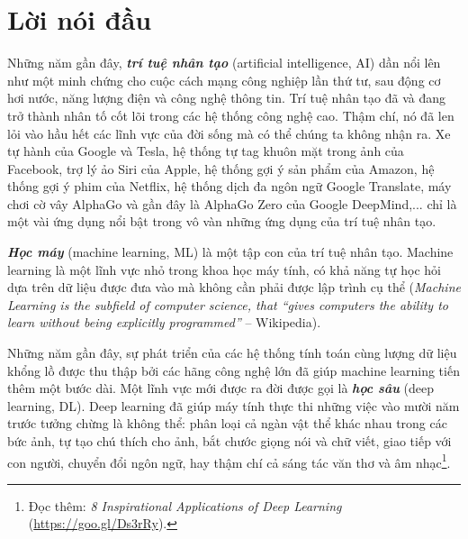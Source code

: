 
\setcounter{chapter}{-1}
\chapter{Lời nói đầu}
\label{cha:introduce}

Những năm gần đây, \textbf{\textit{trí tuệ nhân tạo}} ({artificial
intelligence, AI}) dần nổi lên như một minh chứng cho cuộc cách mạng công
nghiệp lần thứ tư, sau động cơ hơi nước, năng lượng điện và công nghệ thông
tin. Trí tuệ nhân tạo đã và đang trở thành nhân tố cốt lõi trong các hệ thống
công nghệ cao. Thậm chí, nó đã len lỏi vào hầu hết các lĩnh vực của đời sống mà
có thể chúng ta không nhận ra. Xe tự hành của Google và Tesla, hệ thống tự tag
khuôn mặt trong ảnh của Facebook, trợ lý ảo Siri của Apple, hệ thống gợi ý sản
phẩm của Amazon, hệ thống gợi ý phim của Netflix, hệ thống dịch đa ngôn ngữ
Google Translate, máy chơi cờ vây AlphaGo và gần đây là AlphaGo Zero của Google
DeepMind,... chỉ là một vài ứng dụng nổi bật trong vô vàn những ứng dụng của
trí tuệ nhân tạo.

\textbf{\textit{Học máy}} ({machine learning, ML}) là một tập con của
trí tuệ nhân tạo. Machine learning là một lĩnh vực nhỏ trong khoa học máy tính,
có khả năng tự học hỏi dựa trên dữ liệu được đưa vào mà không cần phải được lập
trình cụ thể (\textit{Machine Learning is the subfield of computer science, that
``gives computers the ability to learn without being explicitly programmed''} --
Wikipedia).

Những năm gần đây, sự phát triển của các hệ thống tính toán cùng lượng dữ liệu
khổng lồ được thu thập bởi các hãng công nghệ lớn đã giúp machine learning tiến
thêm một bước dài. Một lĩnh vực mới được ra đời được gọi là \textbf{\textit{học
sâu}} ({deep learning, DL}). Deep learning đã giúp máy tính thực thi
những việc vào mười năm trước tưởng chừng là không thể: phân loại cả ngàn vật
thể khác nhau trong các bức ảnh, tự tạo chú thích cho ảnh, bắt chước giọng nói
và chữ viết, giao tiếp với con người, chuyển đổi ngôn ngữ, hay thậm chí cả sáng
tác văn thơ và âm nhạc\footnote{Đọc thêm: \textit{8 Inspirational Applications
of Deep Learning} (\url{https://goo.gl/Ds3rRy}).}.


